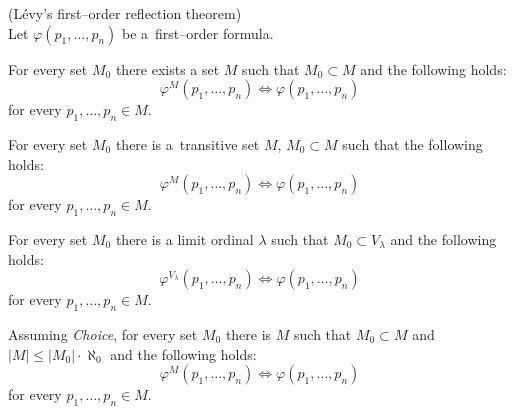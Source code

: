 \begin{theorem}{(Lévy's first–order reflection theorem)}\label{theorem:first_order_reflection}\\
Let $\varphi(p_1, \ldots, p_n)$ be a~first–order formula.
\bce[(i)]
\item For every set $M_0$ there exists a set $M$ such that $M_0 \subset M$ and the following holds:
\begin{equation}
\varphi^M(p_1, \ldots, p_n) \iff \varphi(p_1, \ldots, p_n)\label{equation:levy_theorem_i}
\end{equation}
for every $p_1, \ldots, p_n \in M$.

\item For every set $M_0$ there is a~transitive set $M$, $M_0 \subset M$ such that the following holds:
\begin{equation}
\varphi^M(p_1, \ldots, p_n) \iff \varphi(p_1, \ldots, p_n)
\end{equation}
for every $p_1, \ldots, p_n \in M$.

\item For every set $M_0$ there is a limit ordinal $\lambda$ such that $M_0 \subset V_{\lambda}$ and the following holds:
\begin{equation}
\varphi^{V_{\lambda}}(p_1, \ldots, p_n) \iff \varphi(p_1, \ldots, p_n)
\end{equation}
for every $p_1, \ldots, p_n \in M$.

\item Assuming \emph{Choice}, for every set $M_0$ there is $M$ such that $M_0 \subset M$ and $|M| \leq |M_0| \cdot \aleph_0$ and the following holds:
\begin{equation}
\varphi^M(p_1, \ldots, p_n) \iff \varphi(p_1, \ldots, p_n)
\end{equation}
for every $p_1, \ldots, p_n \in M$.
\ece
\end{theorem}


